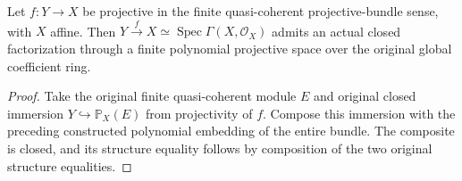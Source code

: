 \begin{corollary}
\label{cor:fc-projective-bundle-to-polynomial-factorization}
\leanok
{}
Let $f:Y\to X$ be projective in the finite quasi-coherent
projective-bundle sense, with $X$ affine.  Then
$Y\xrightarrow f X\simeq\operatorname{Spec}\Gamma(X,\mathcal O_X)$
admits an actual closed factorization through a finite polynomial
projective space over the original global coefficient ring.
\end{corollary}
\begin{proof}
Take the original finite quasi-coherent module $E$ and original closed
immersion $Y\hookrightarrow\mathbb P_X(E)$ from projectivity of $f$.
Compose this immersion with the preceding constructed polynomial
embedding of the entire bundle.  The composite is closed, and its
structure equality follows by composition of the two original
structure equalities.
\end{proof}
